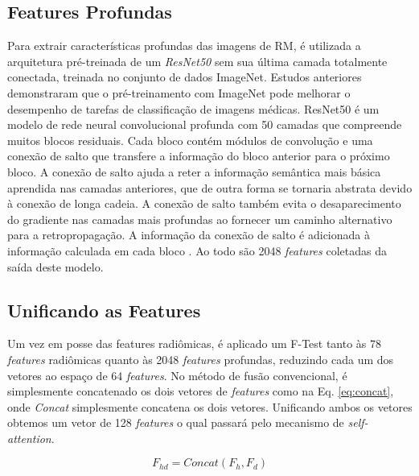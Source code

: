 \subsection{Features Profundas}
\label{subsec:cap4_features_profundas}
 
Para extrair características profundas das imagens de RM, é utilizada a arquitetura pré-treinada de um \textit{ResNet50} sem sua última camada totalmente conectada, treinada no conjunto de dados ImageNet. Estudos anteriores demonstraram que o pré-treinamento com ImageNet pode melhorar o desempenho de tarefas de classificação de imagens médicas. ResNet50 é um modelo de rede neural convolucional profunda com 50 camadas que compreende muitos blocos residuais. Cada bloco contém módulos de convolução e uma conexão de salto que transfere a informação do bloco anterior para o próximo bloco. A conexão de salto ajuda a reter a informação semântica mais básica aprendida nas camadas anteriores, que de outra forma se tornaria abstrata devido à conexão de longa cadeia. A conexão de salto também evita o desaparecimento do gradiente nas camadas mais profundas ao fornecer um caminho alternativo para a retropropagação. A informação da conexão de salto é adicionada à informação calculada em cada bloco \cite{aiSelfAttentionBasedFusion2023}. Ao todo são 2048 \textit{features} coletadas da saída deste modelo.

\subsection{Unificando as Features}
\label{subsec:cap4_unificando_features}

Um vez em posse das features radiômicas, é aplicado um F-Test tanto às 78 \textit{features} radiômicas quanto às 2048 \textit{features} profundas, reduzindo cada um dos vetores ao espaço de 64 \textit{features}. No método de fusão convencional, é simplesmente concatenado os dois vetores de \textit{features} como na Eq. \ref{eq:concat}, onde \textit{Concat} simplesmente concatena os dois vetores. Unificando ambos os vetores obtemos um vetor de 128 \textit{features} o qual passará pelo mecanismo de \textit{self-attention}.

\begin{equation}
F_{hd} = \textit{Concat}(F_h, F_d)
\label{eq:concat}
\end{equation}

